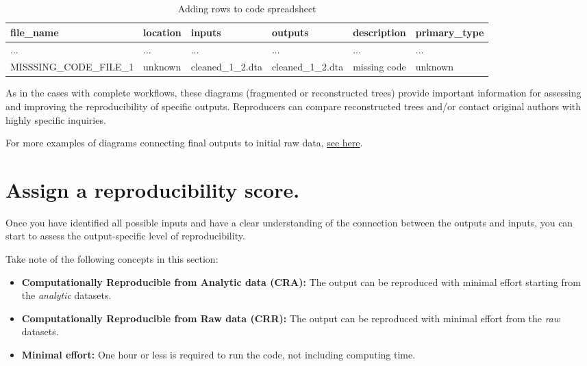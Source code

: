 \documentclass[]{book}
\begin{document}
\begin{table}

\caption{\label{tab:adding-rows}Adding rows to code spreadsheet}
\centering
\begin{tabu} to 
\hline
file\_name & location & inputs & outputs & description & primary\_type\\
\hline
... & ... & ... & ... & ... & ...\\
\hline
MISSSING\_CODE\_FILE\_1 & unknown & cleaned\_1\_2.dta & cleaned\_1\_2.dta & missing code & unknown\\
\hline
\end{tabu}
\end{table}

As in the cases with complete workflows, these diagrams (fragmented or reconstructed trees) provide important information for assessing and improving the reproducibility of specific outputs. Reproducers can compare reconstructed trees and/or contact original authors with highly specific inquiries.

For more examples of diagrams connecting final outputs to initial raw data, \protect\hyperlink{examples-of-reproduction-trees}{see here}.

\hypertarget{score}{%
\section{Assign a reproducibility score.}\label{score}}

Once you have identified all possible inputs and have a clear understanding of the connection between the outputs and inputs, you can start to assess the output-specific level of reproducibility.

Take note of the following concepts in this section:

\begin{itemize}
\item
  \textbf{Computationally Reproducible from Analytic data (CRA):} The output can be reproduced with minimal effort starting from the \emph{analytic} datasets.
\item
  \textbf{Computationally Reproducible from Raw data (CRR):} The output can be reproduced with minimal effort from the \emph{raw} datasets.
\item
  \textbf{Minimal effort:} One hour or less is required to run the code, not including computing time.
\end{itemize}
\end{document}
